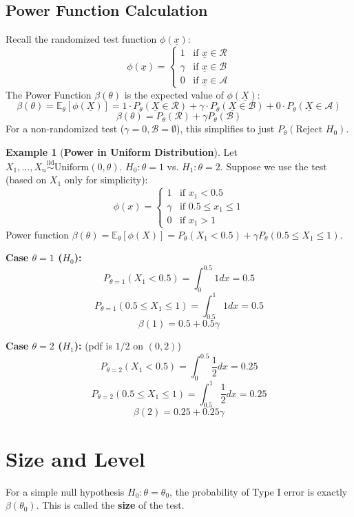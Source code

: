 \documentclass[12pt, a4paper]{article}
\theoremstyle{definition}
\newtheorem{example}{Example}
\newcommand{\E}{\mathbb{E}}
\newcommand{\iid}{\overset{\text{iid}}{\sim}}
\newcommand{\xvec}{\underline{x}}
\newcommand{\Xvec}{\underline{X}}
\begin{document}
\subsection{Power Function Calculation}
Recall the randomized test function $\phi(\xvec)$:
$$ 
\phi(\xvec) = 
\begin{cases} 
1 & \text{if } \xvec \in \mathcal{R} \\
\gamma & \text{if } \xvec \in \mathcal{B} \\
0 & \text{if } \xvec \in \mathcal{A}
\end{cases}
$$
The Power Function $\beta(\theta)$ is the expected value of $\phi(\Xvec)$:
$$ \beta(\theta) = \E_\theta[\phi(\Xvec)] = 1 \cdot P_\theta(\Xvec \in \mathcal{R}) + \gamma \cdot P_\theta(\Xvec \in \mathcal{B}) + 0 \cdot P_\theta(\Xvec \in \mathcal{A}) $$
$$ \beta(\theta) = P_\theta(\mathcal{R}) + \gamma P_\theta(\mathcal{B}) $$
For a non-randomized test ($\gamma=0, \mathcal{B}=\emptyset$), this simplifies to just $P_\theta(\text{Reject } H_0)$.

\begin{example}[\textbf{Power in Uniform Distribution}]
Let $X_1, \dots, X_n \iid \text{Uniform}(0, \theta)$.
$H_0: \theta = 1$ vs. $H_1: \theta = 2$.
Suppose we use the test (based on $X_1$ only for simplicity):
$$ 
\phi(x) = 
\begin{cases} 
1 & \text{if } x_1 < 0.5 \\
\gamma & \text{if } 0.5 \le x_1 \le 1 \\
0 & \text{if } x_1 > 1
\end{cases}
$$
Power function $\beta(\theta) = \E_\theta[\phi(X)] = P_\theta(X_1 < 0.5) + \gamma P_\theta(0.5 \le X_1 \le 1)$.

\textbf{Case $\theta = 1$ ($H_0$):}
$$ P_{\theta=1}(X_1 < 0.5) = \int_0^{0.5} 1 dx = 0.5 $$
$$ P_{\theta=1}(0.5 \le X_1 \le 1) = \int_{0.5}^1 1 dx = 0.5 $$
$$ \beta(1) = 0.5 + 0.5\gamma $$

\textbf{Case $\theta = 2$ ($H_1$):} (pdf is $1/2$ on $(0,2)$)
$$ P_{\theta=2}(X_1 < 0.5) = \int_0^{0.5} \frac{1}{2} dx = 0.25 $$
$$ P_{\theta=2}(0.5 \le X_1 \le 1) = \int_{0.5}^1 \frac{1}{2} dx = 0.25 $$
$$ \beta(2) = 0.25 + 0.25\gamma $$
\end{example}

\section{Size and Level}

For a simple null hypothesis $H_0: \theta = \theta_0$, the probability of Type I error is exactly $\beta(\theta_0)$. This is called the \textbf{size} of the test.
\end{document}
